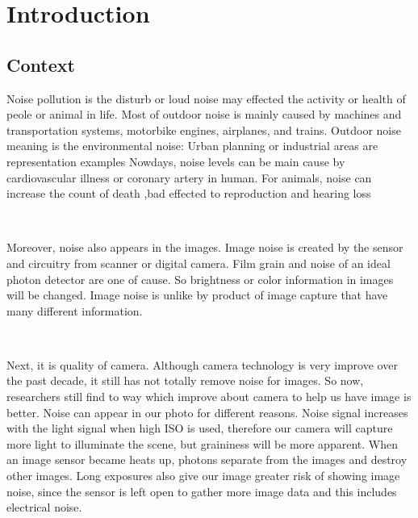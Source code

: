 \chapter{Introduction}






\section{Context}
Noise pollution is the disturb or loud noise may effected the activity or health of peole or
animal in life. Most of outdoor noise is mainly caused by machines and transportation
systems, motorbike engines, airplanes, and trains. Outdoor noise meaning is the
environmental noise: Urban planning or industrial areas are representation examples
Nowdays, noise levels can be main cause by cardiovascular illness or coronary artery in
human. For animals, noise can increase the count of death ,bad effected to reproduction
and hearing loss

\

Moreover, noise also appears in the images. Image noise is created by the sensor and
circuitry from scanner or digital camera. Film grain and noise of an ideal photon detector
are one of cause. So brightness or color information in images will be changed. Image
noise is unlike by product of image capture that have many different information.

\

Next, it is quality of camera. Although camera technology is very improve over the past
decade, it still has not totally remove noise for images. So now, researchers still find to
way which improve about camera to help us have image is better. Noise can appear in our
photo for different reasons. Noise signal increases with the light signal when high ISO is
used, therefore our camera will capture more light to illuminate the scene, but graininess
will be more apparent. When an image sensor became heats up, photons separate from
the images and destroy other images. Long exposures also give our image greater risk of
showing image noise, since the sensor is left open to gather more image data and this
includes electrical noise.

